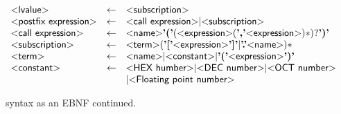\begin{figure}
\[\begin{array}{lcl}
  \pgrammar{lvalue} & \gets & \pgrammar{subscription}\\

  \pgrammar{postfix expression} & \gets & \pgrammar{call expression} | \pgrammar{subscription}\\

  \pgrammar{call expression} & \gets & \pgrammar{name} \plexer{(}
  (\pgrammar{expression} (\plexer{,} \pgrammar{expression})*)?
  \plexer{)}\\

  \pgrammar{subscription} & \gets & \pgrammar{term} (\plexer{[} \pgrammar{expression} \plexer{]} |
                                                     \plexer{.} \pgrammar{name})*\\

  \pgrammar{term} & \gets & \pgrammar{name} | \pgrammar{constant} | \plexer{(} \pgrammar{expression} \plexer{)}\\

  \pgrammar{constant} & \gets & \pgrammar{HEX humber} | \pgrammar{DEC number} | \pgrammar{OCT number}\\&&
  | \pgrammar{Floating point number}\\
\end{array}
\]
  \caption {\pencil{} syntax as an EBNF continued.}
\end{figure}
